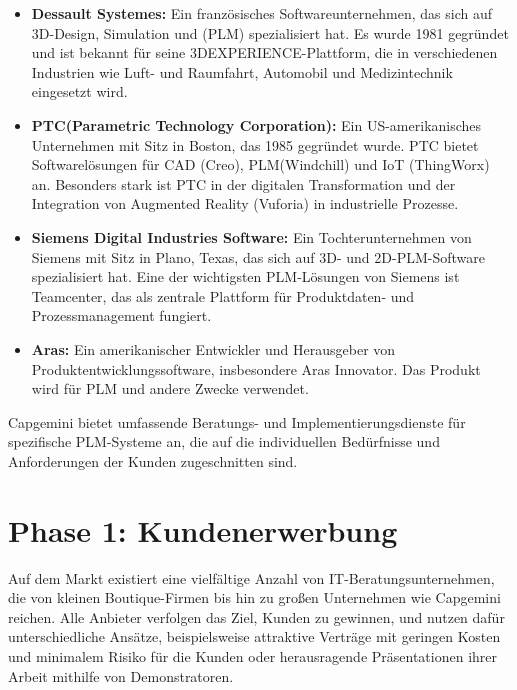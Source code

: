 \documentclass[a4paper, 12pt]{scrartcl}
\begin{document}
	\begin{itemize}
		\item \textbf{Dessault Systemes\cite{Dessault}:} Ein französisches Softwareunternehmen, das sich auf 3D-Design, Simulation und  (PLM) spezialisiert hat. Es wurde 1981 gegründet und ist bekannt für seine 3DEXPERIENCE-Plattform, die in verschiedenen Industrien wie Luft- und Raumfahrt, Automobil und Medizintechnik eingesetzt wird.
		\item \textbf{PTC(Parametric Technology Corporation)\cite{PTC}:} Ein US-amerikanisches Unternehmen mit Sitz in Boston, das 1985 gegründet wurde. PTC bietet Softwarelösungen für CAD (Creo), PLM(Windchill) und IoT (ThingWorx) an. Besonders stark ist PTC in der digitalen Transformation und der Integration von Augmented Reality (Vuforia) in industrielle Prozesse.
		\item \textbf{Siemens Digital Industries Software\cite{Siemens}:} Ein Tochterunternehmen von Siemens mit Sitz in Plano, Texas, das sich auf 3D- und 2D-PLM-Software spezialisiert hat.  Eine der wichtigsten PLM-Lösungen von Siemens ist Teamcenter, das als zentrale Plattform für Produktdaten- und Prozessmanagement fungiert.
		\item \textbf{Aras\cite{Aras}:} Ein amerikanischer Entwickler und Herausgeber von Produktentwicklungssoftware, insbesondere Aras Innovator. Das Produkt wird für PLM und andere Zwecke verwendet.
	\end{itemize}
	Capgemini bietet umfassende Beratungs- und Implementierungsdienste für spezifische PLM-Systeme an, die auf die individuellen Bedürfnisse und Anforderungen der Kunden zugeschnitten sind. 
	\newpage
	\section{Phase 1: Kundenerwerbung} 
Auf dem Markt existiert eine vielfältige Anzahl von IT-Beratungsunternehmen, die von kleinen Boutique-Firmen bis hin zu großen Unternehmen wie Capgemini reichen. Alle Anbieter verfolgen das Ziel, Kunden zu gewinnen, und nutzen dafür unterschiedliche Ansätze, beispielsweise attraktive Verträge mit geringen Kosten und minimalem Risiko für die Kunden oder herausragende Präsentationen ihrer Arbeit mithilfe von Demonstratoren\cite{muhonen2013qualification}.
\end{document}
